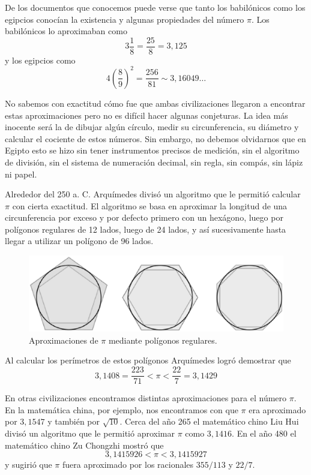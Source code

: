 De los documentos que conocemos puede verse que tanto los babilónicos como los
egipcios conocían la existencia y algunas propiedades del número $\pi$. Los
babilónicos lo aproximaban como
\[
	3\frac18=\frac{25}{8}=3,125
\]
y los egipcios como 
\[
	4\left(\frac89\right)^2=\frac{256}{81}\sim 3,16049\dots
\]

No sabemos con exactitud cómo fue que ambas civilizaciones llegaron a encontrar
estas aproximaciones pero no es difícil hacer algunas conjeturas. La idea más
inocente será la de dibujar algún círculo, medir su circunferencia, su diámetro y
calcular el cociente de estos números. Sin embargo, no debemos olvidarnos que
en Egipto esto se hizo sin tener instrumentos precisos de medición, sin el
algoritmo de división, sin el sistema de numeración decimal, sin regla, sin
compás, sin lápiz ni papel. 

Alrededor del 250 a. C. Arquímedes divisó un algoritmo que le permitió calcular
$\pi$ con cierta exactitud. El algoritmo se basa en aproximar la longitud de
una circunferencia por exceso y por defecto primero con un hexágono, luego por
polígonos regulares de 12 lados, luego de 24 lados, y así sucesivamente hasta llegar a utilizar
un polígono de 96 lados. %

\begin{figure}[h]
		\centering
		\includegraphics[scale=0.4]{images/archimedes}
		\caption{Aproximaciones de $\pi$ mediante polígonos regulares.}
		\label{fig:Arquimedes}
\end{figure}

Al calcular los perímetros de estos polígonos
Arquímedes logró demostrar que
\[
	3,1408=\frac{223}{71}<\pi<\frac{22}{7}=3,1429
\]

En otras civilizaciones encontramos distintas aproximaciones para el número
$\pi$. En la matemática china, por ejemplo, nos encontramos con que $\pi$ era
aproximado por $3,1547$ y también por $\sqrt{10}$. Cerca del año 265 el
matemático chino Liu Hui divisó un algoritmo que le permitió aproximar $\pi$
como $3,1416$.  En el año 480 el matemático chino Zu Chongzhi mostró que 
\[
	3,1415926<\pi<3,1415927
\]
y sugirió que $\pi$ fuera aproximado por los racionales $355/113$ y $22/7$. 

